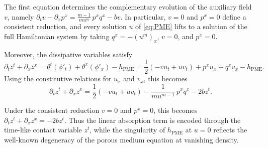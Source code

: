\documentclass[11pt,a4paper]{article}
\theoremstyle{plain} \newtheorem{theorem}{Theorem}[section] \newtheorem{proposition}[theorem]{Proposition} \newtheorem{corollary}[theorem]{Corollary} \newtheorem{lemma}[theorem]{Lemma} \theoremstyle{definition} \newtheorem{definition}[theorem]{Definition} \theoremstyle{remark} \newtheorem{remark}[theorem]{Remark} \newtheorem{example}[theorem]{Example} %
\begin{document}
The first equation determines the complementary evolution of the auxiliary field \(v\), namely \(\partial_t v-\partial_x p^x=\frac{m-1}{m u^m}\,p^x q^x-b v\). In particular, \(v=0\) and \(p^x=0\) define a consistent reduction, and every solution \(u\) of \eqref{eq:PME} lifts to a solution of the full Hamiltonian system by taking \(q^x=-(u^m)_x\), \(v=0\), and \(p^x=0\).

Moreover, the dissipative variables satisfy
\[
\partial_t z^t+\partial_x z^x=\theta^t(\phi'_t)+\theta^x(\phi'_x)-h_{\mathrm{PME}}
=\frac12(-v u_t+u v_t)+p^x u_x+q^x v_x-h_{\mathrm{PME}}.
\]
Using the constitutive relations for \(u_x\) and \(v_x\), this becomes
\[
\partial_t z^t+\partial_x z^x=\frac12(-v u_t+u v_t)-\frac{1}{m u^{m-1}}\,p^x q^x-2bz^t.
\]

Under the consistent reduction \(v=0\) and \(p^x=0\), this becomes \(\partial_t z^t+\partial_x z^x=-2b z^t\). Thus the linear absorption term is encoded through the time-like contact variable \(z^t\), while the singularity of \(h_{\mathrm{PME}}\) at \(u=0\) reflects the well-known degeneracy of the porous medium equation at vanishing density.

 
 
\end{document}
